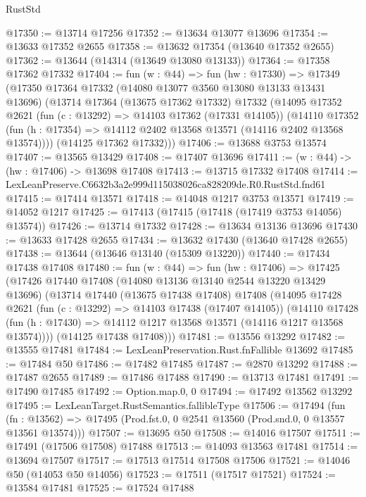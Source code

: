 \begin{lexlean}{RustStd}
\begin{coremodule}
@17350 := @13714 @17256
@17352 := @13634 @13077 @13696
@17354 := @13633 @17352 @2655
@17358 := @13632 @17354 (@13640 @17352 @2655)
@17362 := @13644 (@14314 (@13649 @13080 @13133))
@17364 := @17358 @17362 @17332
@17404 := fun (w : @44) =>
  fun (hw : @17330) =>
  @17349
    (@17350
      @17364
      @17332
      (@14080 @13077 @3560 @13080 @13133 @13431 @13696)
      (@13714
        @17364
        (@13675 @17362 @17332)
        @17332
        (@14095
          @17352
          @2621
          (fun (c : @13292) => @14103 @17362 (@17331 @14105))
          (@14110
            @17352
            (fun (h : @17354) => @14112 @2402 @13568 @13571 (@14116 @2402 @13568 @13574))))
        (@14125 @17362 @17332)))
@17406 := @13688 @3753 @13574
@17407 := @13565 @13429
@17408 := @17407 @13696
@17411 := (w : @44) -> (hw : @17406) -> @13698 @17408
@17413 := @13715 @17332 @17408
@17414 := LexLeanPreserve.C6632b3a2e999d115038026ca828209de.R0.RustStd.fnd61
@17415 := @17414 @13571
@17418 := @14048 @1217 @3753 @13571
@17419 := @14052 @1217
@17425 := @17413 (@17415 (@17418 (@17419 @3753 @14056) @13574))
@17426 := @13714 @17332
@17428 := @13634 @13136 @13696
@17430 := @13633 @17428 @2655
@17434 := @13632 @17430 (@13640 @17428 @2655)
@17438 := @13644 (@13646 @13140 (@15309 @13220))
@17440 := @17434 @17438 @17408
@17480 := fun (w : @44) =>
  fun (hw : @17406) =>
  @17425
    (@17426
      @17440
      @17408
      (@14080 @13136 @13140 @2544 @13220 @13429 @13696)
      (@13714
        @17440
        (@13675 @17438 @17408)
        @17408
        (@14095
          @17428
          @2621
          (fun (c : @13292) => @14103 @17438 (@17407 @14105))
          (@14110
            @17428
            (fun (h : @17430) => @14112 @1217 @13568 @13571 (@14116 @1217 @13568 @13574))))
        (@14125 @17438 @17408)))
@17481 := @13556 @13292
@17482 := @13555 @17481
@17484 := LexLeanPreservation.Rust.fnFallible @13692
@17485 := @17484 @50
@17486 := @17482 @17485
@17487 := @2870 @13292
@17488 := @17487 @2655
@17489 := @17486 @17488
@17490 := @13713 @17481
@17491 := @17490 @17485
@17492 := Option.map.{0, 0}
@17494 := @17492 @13562 @13292
@17495 := LexLeanTarget.RustSemantics.fallibleType
@17506 := @17494
    (fun (fn : @13562) =>
    @17495 (Prod.fst.{0, 0} @2541 @13560 (Prod.snd.{0, 0} @13557 @13561 @13574)))
@17507 := @13695 @50
@17508 := @14016 @17507
@17511 := @17491 (@17506 @17508) @17488
@17513 := @14093 @13563 @17481
@17514 := @13694 @17507
@17517 := @17513 @17514 @17508 @17506
@17521 := @14046 @50 (@14053 @50 @14056)
@17523 := @17511 (@17517 @17521)
@17524 := @13584 @17481
@17525 := @17524 @17488

\end{coremodule}
\end{lexlean}
